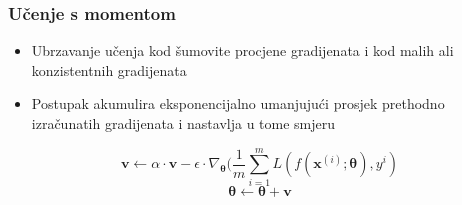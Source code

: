 \documentclass{beamer}
\begin{document}
\begin{frame}[noframenumbering]
	\frametitle{Učenje s momentom}
	\begin{itemize}
		\item Ubrzavanje učenja kod šumovite procjene gradijenata i kod malih ali konzistentnih gradijenata
		\item Postupak akumulira eksponencijalno umanjujući prosjek prethodno izračunatih gradijenata i nastavlja u tome smjeru
	\end{itemize}
	\begin{equation}
		\bm{v} \leftarrow \alpha \cdot \bm{v} - \epsilon \cdot \nabla_{\bm{\theta}}(\frac{1}{m} \sum_{i=1}^{m}L(f(\bm{x}^{(i)}; \bm{\theta}), y^i )
	\end{equation}
	\begin{equation}
		\bm{\theta} \leftarrow \bm{\theta} + \bm{v}
	\end{equation}

\end{frame}

\end{document}
